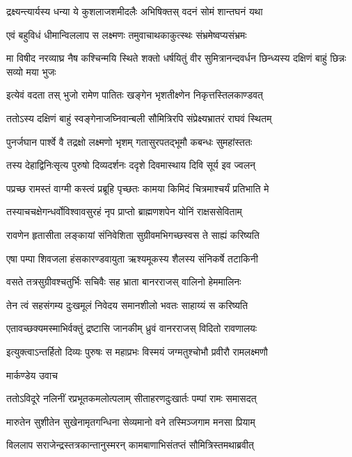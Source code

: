 \twolineshloka
{द्रक्ष्यन्त्यार्यस्य धन्या ये कुशलाजशमीदलैः}
{अभिषिक्तस् वदनं सोमं शान्तघनं यथा}


\twolineshloka
{एवं बहुविधं धीमान्विललाप स लक्ष्मणः}
{तमुवाचाथकाकुत्स्थः संभ्रमेष्वप्यसंभ्रमः}


\threelineshloka
{मा विषीद नरव्याघ्र नैष कश्चिन्मयि स्थिते}
{शक्तो धर्षयितुं वीर सुमित्रानन्दवर्धन}
{छिन्ध्यस्य दक्षिणं बाहुं छिन्नः सव्यो मया भुजः}


\twolineshloka
{इत्येवं वदता तस् भुजो रामेण पातितः}
{खङ्गेन भृशतीक्ष्णेन निकृत्तस्तिलकाण्डवत्}


\twolineshloka
{ततोऽस्य दक्षिणं बाहुं स्वङ्गेनाजघ्निवान्बली}
{सौमित्रिरपि संप्रेक्ष्यभ्रातरं राघवं स्थितम्}


\twolineshloka
{पुनर्जघान पार्श्वे वै तद्रक्षो लक्ष्मणो भृशम्}
{गतासुरपतद्भूमौ कबन्धः सुमहांस्ततः}


\twolineshloka
{तस्य देहाद्विनिःसृत्य पुरुषो दिव्यदर्शनः}
{ददृशे दिवमास्थाय दिवि सूर्य इव ज्वलन्}


\twolineshloka
{पप्रच्छ रामस्तं वाग्मी कस्त्वं प्रब्रूहि पृच्छतः}
{कामया किमिदं चित्रमाश्चर्यं प्रतिभाति मे}


\twolineshloka
{तस्याचचक्षेगन्धर्वोविश्वावसुरहं नृप}
{प्राप्तो ब्राह्मणशपेन योनिं राक्षससेविताम्}


\twolineshloka
{रावणेन हृतासीता लङ्कायां संनिवेशिता}
{सुग्रीवमभिगच्छस्वस ते साह्यं करिष्यति}


\twolineshloka
{एषा पम्पा शिवजला हंसकारण्डवायुता}
{ऋश्यमूकस्य शैलस्य संनिकर्षे तटाकिनी}


\twolineshloka
{वसते तत्रसुग्रीवश्चतुर्भिः सचिवैः सह}
{भ्राता बानरराजस् वालिनो हेममालिनः}


\twolineshloka
{तेन त्वं सहसंगम्य दुःखमूलं निवेदय}
{समानशीलो भवतः साहाय्यं स करिष्यति}


\twolineshloka
{एतावच्छक्यमस्माभिर्वक्तुं द्रष्टासि जानकीम्}
{ध्रुवं वानरराजस् विदितो रावणालयः}


\twolineshloka
{इत्युक्त्वाऽन्तर्हितो दिव्यः पुरुषः स महाप्रभः}
{विस्मयं जग्मतुश्चोभौ प्रवीरौ रामलक्ष्मणौ}


\twolineshloka
{मार्कण्डेय उवाच}
{}


\twolineshloka
{ततोऽविदूरे नलिनीं रप्रभूतकमलोत्पलाम्}
{सीताहरणदुःखार्तः पम्पां रामः समासदत्}


\twolineshloka
{मारुतेन सुशीतेन सुखेनामृतगन्धिना}
{सेव्यमानो वने तस्मिञ्जगाम मनसा प्रियाम्}


\twolineshloka
{विललाप सराजेन्द्रस्तत्रकान्तानुस्मरन्}
{कामबाणाभिसंतप्तं सौमित्रिस्तमथाब्रवीत्}


